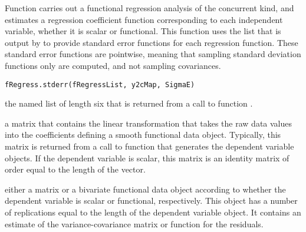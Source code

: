 \documentclass{article}
\begin{document}
\begin{Description}\relax
Function  carries out a functional regression analysis
of the concurrent kind, and estimates a regression coefficient function
corresponding to each independent variable, whether it is scalar or
functional.  This function uses the list that is output by 
to provide standard error functions for each regression function.  These
standard error functions are pointwise, meaning that sampling standard
deviation functions only are computed, and not sampling covariances.
\end{Description}
\begin{Usage}
\begin{verbatim}
fRegress.stderr(fRegressList, y2cMap, SigmaE)
\end{verbatim}
\end{Usage}
\begin{Arguments}
\begin{ldescription}
\item[\code{fRegressList}] the named list of length six that is returned from a call to function
.

\item[\code{y2cMap}] a matrix that contains the linear transformation that
takes the raw data values into the coefficients defining a smooth
functional data object. Typically, this matrix is returned from a
call to function  that generates the
dependent variable objects.  If the dependent variable is scalar,
this matrix is an identity matrix of order equal to the length
of the vector.

\item[\code{SigmaE}] either a matrix or a bivariate functional data object
according to whether the dependent variable is scalar or functional,
respectively.
This object has a number of replications equal to
the length of the dependent variable object.  It contains an estimate
of the variance-covariance matrix or function for the residuals.

\end{ldescription}
\end{Arguments}
\end{document}
